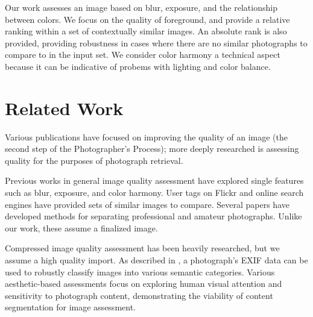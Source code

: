 \documentclass[twocolumn]{article}
\begin{document}
Our work assesses an image based on blur, exposure, and the relationship between colors. We focus on the quality of foreground, and provide a relative ranking within a set of contextually similar images. An absolute rank is also provided, providing robustness in cases where there are no similar photographs to compare to in the input set.  We consider color harmony a technical aspect because it can be indicative of probems with lighting and color balance.

\section{Related Work}
Various publications have focused on improving the quality of an image (the second step of the Photographer's Process)\cite{Bhattacahrya:2010:FPA:1873951.1873990}\cite{Kopf:2008:DPM:1409060.1409069}; more deeply researched is assessing quality for the purposes of photograph retrieval\cite{Yeh:2010:PPR:1873951.1873963}\cite{vanZwol:2010:FEI:1772690.1772788}\cite{springerlink:10.1007/978-3-642-17187-1_57}\cite{Cui:2008:RTG:1459359.1459471}\cite{Chu2010256}.

Previous works in general image quality assessment have explored single features such as blur\cite{springerlink:10.1007/978-3-540-77409-9_26}, exposure\cite{5540170}, and color harmony\cite{COL:COL5080160410}\cite{COL:COL10004}. User tags on Flickr and online search engines have provided sets of similar images to compare\cite{Berg:EECS-2007-13}\cite{Chu2010256}. Several papers have developed methods for separating professional and amateur photographs\cite{springerlink:10.1007/978-3-540-30541-5_25}\cite{springerlink:10.1007/11744078_23}\cite{1640788}\cite{springerlink:10.1007/978-3-540-88690-7_29}. Unlike our work, these assume a finalized image.

Compressed image quality assessment has been heavily researched\cite{477498}\cite{1038064}\cite{1284395}, but we assume a high quality import. As described in \cite{1315222}, a photograph's EXIF data can be used to robustly classify images into various semantic categories. Various aesthetic-based assessments focus on exploring human visual attention and sensitivity to photograph content\cite{Sun:2009:PAB:1631272.1631351}\cite{1518955}\cite{Pimenov_fastimage}, demonstrating the viability of content segmentation for image assessment.
\end{document}
